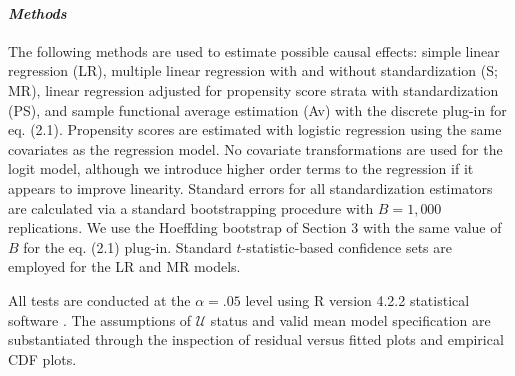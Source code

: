 \documentclass[12pt]{amsart}
\theoremstyle{plain}%
\theoremstyle{definition}
\theoremstyle{remark}
\numberwithin{equation}{section}
\begin{document}
\paragraph{\textit{Methods}} The following methods are used to estimate possible causal effects: simple linear regression (LR), multiple linear regression with and without standardization (S; MR), linear regression adjusted for propensity score strata with standardization (PS), and sample functional average estimation (Av) with the discrete plug-in for eq. (2.1). Propensity scores are estimated with logistic regression using the same covariates as the regression model. No covariate transformations are used for the logit model, although we introduce higher order terms to the regression if it appears to improve linearity. Standard errors for all standardization estimators are calculated via a standard bootstrapping procedure with $B=1,000$ replications. We use the Hoeffding bootstrap of Section 3 with the same value of $B$ for the eq. (2.1) plug-in. Standard $ t$-statistic-based confidence sets are employed for the LR and MR models.

All tests are conducted at the $\alpha = .05$ level using R version 4.2.2 statistical software \cite{r}. The assumptions of $\mathcal{U}$ status and valid mean model specification are substantiated through the inspection of residual versus fitted plots and empirical CDF plots.
\newline
\end{document}
